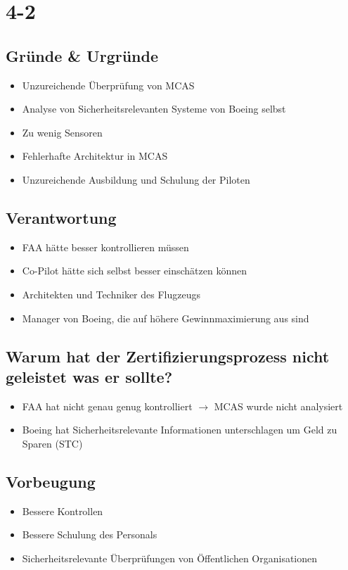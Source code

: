 \documentclass[11pt,a4paper]{article}
\begin{document}
\newpage
\section*{4-2}
\subsection*{Gründe \& Urgründe}
\begin{itemize}
	\item Unzureichende Überprüfung von MCAS
	\item Analyse von Sicherheitsrelevanten Systeme von Boeing selbst
	\item Zu wenig Sensoren
	\item Fehlerhafte Architektur in MCAS
	\item Unzureichende Ausbildung und Schulung der Piloten
\end{itemize}

\subsection*{Verantwortung}
\begin{itemize}
	\item FAA hätte besser kontrollieren müssen
	\item Co-Pilot hätte sich selbst besser einschätzen können
	\item Architekten und Techniker des Flugzeugs
	\item Manager von Boeing, die auf höhere Gewinnmaximierung aus sind
\end{itemize}

\subsection*{Warum hat der Zertifizierungsprozess nicht geleistet was er sollte?}
\begin{itemize}
	\item FAA hat nicht genau genug kontrolliert $\longrightarrow$ MCAS wurde nicht analysiert
	\item Boeing hat Sicherheitsrelevante Informationen unterschlagen um Geld zu Sparen (STC)
\end{itemize}

\subsection*{Vorbeugung}
\begin{itemize}
	\item Bessere Kontrollen
	\item Bessere Schulung des Personals
	\item Sicherheitsrelevante Überprüfungen von Öffentlichen Organisationen
\end{itemize}
\end{document}

